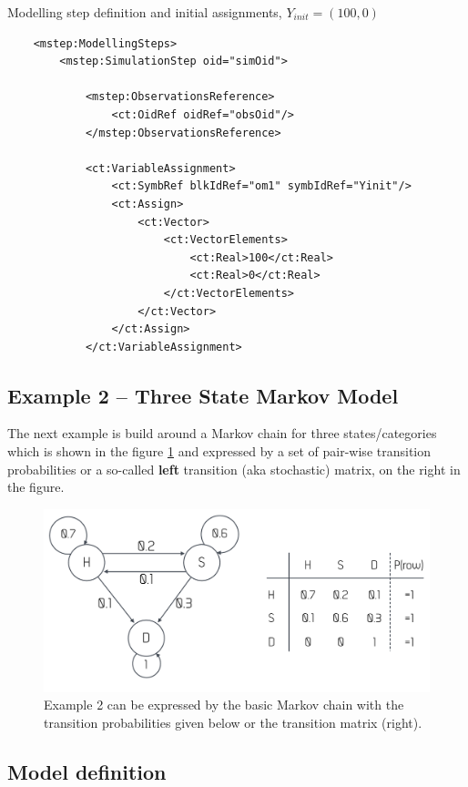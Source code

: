Modelling step definition and initial assignments, $Y_{init} = (100, 0)$
\lstset{language=XML}
\begin{lstlisting}
    <mstep:ModellingSteps>
        <mstep:SimulationStep oid="simOid">
            
            <mstep:ObservationsReference>
                <ct:OidRef oidRef="obsOid"/>
            </mstep:ObservationsReference>
            
            <ct:VariableAssignment>
                <ct:SymbRef blkIdRef="om1" symbIdRef="Yinit"/>
                <ct:Assign>
                    <ct:Vector>
                        <ct:VectorElements>
                            <ct:Real>100</ct:Real>
                            <ct:Real>0</ct:Real>
                        </ct:VectorElements>
                    </ct:Vector>
                </ct:Assign>
            </ct:VariableAssignment>
\end{lstlisting}



\subsection{Example 2 -- Three State Markov Model}
\label{subsec:exp2}

The next example is build around a Markov chain for three states/categories
which is shown in the figure \ref{fig:example2} and expressed by a set
of pair-wise transition probabilities or a so-called \textbf{left} transition 
(aka stochastic) matrix, on the right in the figure.
\begin{figure}[ht!]
\centering
  \includegraphics[width=120mm]{pics/example2.pdf}
 \caption{Example 2 can be expressed by the basic Markov chain with the
 transition probabilities given below or the transition matrix (right).}
 \label{fig:example2}
\end{figure}


\subsection*{Model definition}
